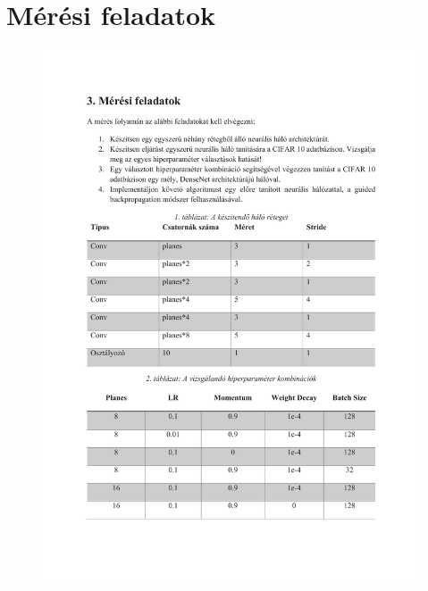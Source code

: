 \chapter{Mérési feladatok}\label{sect:LatexTools}

\begin{figure}[!ht]
	\includegraphics[trim = 25mm 210mm 20mm 33mm,clip, width=150mm,keepaspectratio]{figures/feladatok_m07.pdf}
	\label{fig:Road-of-a-char}
\end{figure}
